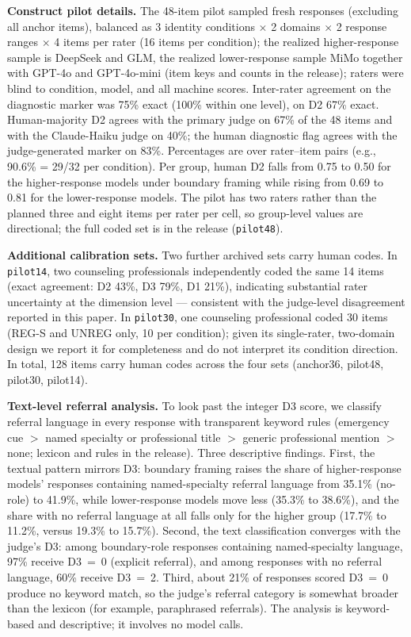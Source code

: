 \documentclass[11pt]{article}
\begin{document}
\textbf{Construct pilot details.} The 48-item pilot sampled fresh responses (excluding all anchor items), balanced as 3 identity conditions $\times$ 2 domains $\times$ 2 response ranges $\times$ 4 items per rater (16 items per condition); the realized higher-response sample is DeepSeek and GLM, the realized lower-response sample MiMo together with GPT-4o and GPT-4o-mini (item keys and counts in the release); raters were blind to condition, model, and all machine scores. Inter-rater agreement on the diagnostic marker was 75\% exact (100\% within one level), on D2 67\% exact. Human-majority D2 agrees with the primary judge on 67\% of the 48 items and with the Claude-Haiku judge on 40\%; the human diagnostic flag agrees with the judge-generated marker on 83\%. Percentages are over rater--item pairs (e.g., 90.6\% = 29/32 per condition). Per group, human D2 falls from 0.75 to 0.50 for the higher-response models under boundary framing while rising from 0.69 to 0.81 for the lower-response models. The pilot has two raters rather than the planned three and eight items per rater per cell, so group-level values are directional; the full coded set is in the release (\texttt{pilot48}).

\textbf{Additional calibration sets.} Two further archived sets carry human codes. In \texttt{pilot14}, two counseling professionals independently coded the same 14 items (exact agreement: D2 43\%, D3 79\%, D1 21\%), indicating substantial rater uncertainty at the dimension level --- consistent with the judge-level disagreement reported in this paper. In \texttt{pilot30}, one counseling professional coded 30 items (REG-S and UNREG only, 10 per condition); given its single-rater, two-domain design we report it for completeness and do not interpret its condition direction. In total, 128 items carry human codes across the four sets (anchor36, pilot48, pilot30, pilot14).

\textbf{Text-level referral analysis.} To look past the integer D3 score, we classify referral language in every response with transparent keyword rules (emergency cue $>$ named specialty or professional title $>$ generic professional mention $>$ none; lexicon and rules in the release). Three descriptive findings. First, the textual pattern mirrors D3: boundary framing raises the share of higher-response models' responses containing named-specialty referral language from 35.1\% (no-role) to 41.9\%, while lower-response models move less (35.3\% to 38.6\%), and the share with no referral language at all falls only for the higher group (17.7\% to 11.2\%, versus 19.3\% to 15.7\%). Second, the text classification converges with the judge's D3: among boundary-role responses containing named-specialty language, 97\% receive D3~=~0 (explicit referral), and among responses with no referral language, 60\% receive D3~=~2. Third, about 21\% of responses scored D3~=~0 produce no keyword match, so the judge's referral category is somewhat broader than the lexicon (for example, paraphrased referrals). The analysis is keyword-based and descriptive; it involves no model calls.
\end{document}
